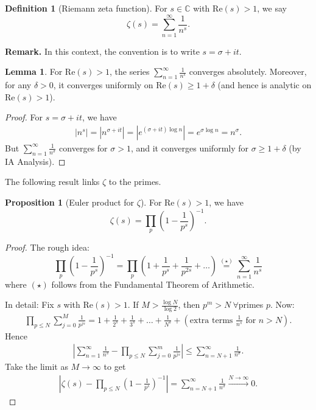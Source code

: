 \documentclass{article}
\theoremstyle{definition}
\newtheorem{lemma}[theorem]{Lemma}
\newtheorem{prop}[theorem]{Proposition}
\newtheorem{defn}{Definition}[section]
\begin{document}
\begin{defn}[Riemann zeta function]
    For $s \in \mathbb{C}$ with $\text{Re}(s)>1$, we say $$\zeta(s) = \sum_{n=1}^{\infty} \frac{1}{n^s}.$$
\end{defn}
\textbf{Remark.} In this context, the convention is to write $s = \sigma + it$.
\begin{lemma}
    For $\text{Re}(s)>1$, the series $\sum_{n=1}^{\infty} \frac{1}{n^s}$ converges absolutely. Moreover, for any $\delta>0$, it converges uniformly on $\text{Re}(s)\ge 1+\delta$ (and hence is analytic on $\text{Re}(s)>1$).    
\end{lemma}
\begin{proof}
    For $s = \sigma + it$, we have 
    \begin{align*}
        |n^s| = |n^{\sigma + it}| = |e^{(\sigma+it)\log n}| = e^{\sigma \log n} = n^\sigma.
    \end{align*}
    But $\sum_{n=1}^{\infty} \frac{1}{n^\sigma}$ converges for $\sigma>1$, and it converges uniformly for $\sigma \ge 1 + \delta$ (by IA Analysis).
\end{proof}
The following result links $\zeta$ to the primes.
\begin{prop}[Euler product for $\zeta$]
    For $\text{Re}(s)>1$, we have \[
    \zeta(s) = \prod_{p}^{} \left(1-\frac{1}{p^s}\right)^{-1}. 
    \]
\end{prop}
\begin{proof}
    The rough idea:
    \[
    \prod_{p}^{} \left(1-\frac{1}{p^s}\right)^{-1} = \prod_{p}^{} \left(1+\frac{1}{p^s}+\frac{1}{p^{2s}}+\ldots \right) \stackrel{(\star)}{=} \sum_{n=1}^{\infty} \frac{1}{n^s}
    \] where $(\star)$ follows from the Fundamental Theorem of Arithmetic.
    \vspace{1mm}
    
    In detail: Fix $s$ with $\text{Re}(s)>1$. If $M>\frac{\log N}{\log 2}$, then $p^m > N ~\forall $primes $p$. Now:
    \begin{align*}
        \prod_{p\le N}^{} \sum_{j=0}^{M} \frac{1}{p^{js}} = 1+ \frac{1}{2^s} + \frac{1}{3^s} + \ldots + \frac{1}{N^s} + \left(\text{extra terms }\frac{1}{n^s} \text{ for }n>N \right).
    \end{align*}
    Hence
    \begin{align*}
        \left|\sum_{n=1}^{\infty} \frac{1}{n^s} - \prod_{p\le N}^{} \sum_{j=0}^{m} \frac{1}{p^{js}} \right| \le \sum_{n=N+1}^{\infty} \frac{1}{n^\sigma}.
    \end{align*}
    Take the limit as $M \to \infty$ to get 
    \begin{align*}
        \left|\zeta(s)- \prod_{p\le N}^{} \left(1-\frac{1}{p^s}\right)^{-1}\right| = \sum_{n=N+1}^{\infty} \frac{1}{n^{\sigma}} \stackrel{N \to \infty}{\to} 0.
    \end{align*}
\end{proof}
\end{document}
